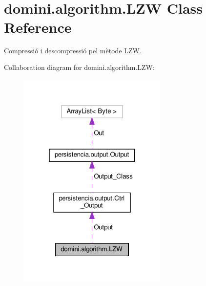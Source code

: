 \hypertarget{classdomini_1_1algorithm_1_1LZW}{}\section{domini.\+algorithm.\+L\+ZW Class Reference}
\label{classdomini_1_1algorithm_1_1LZW}


Compressió i descompressió pel mètode \hyperlink{classdomini_1_1algorithm_1_1LZW}{L\+ZW}.  




Collaboration diagram for domini.\+algorithm.\+L\+ZW\+:\nopagebreak
\begin{figure}[H]
\begin{center}
\leavevmode
\includegraphics[width=211pt]{classdomini_1_1algorithm_1_1LZW__coll__graph}
\end{center}
\end{figure}
